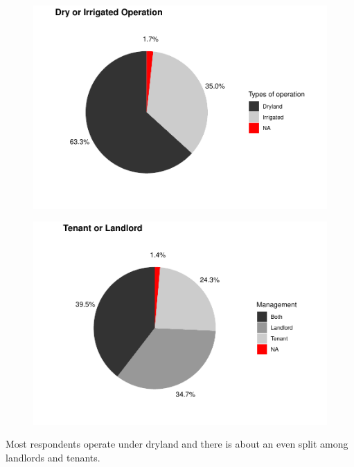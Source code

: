 \documentclass[a4paper]{article}
\begin{document}
\begin{minipage}{0.5\textwidth}
	\begin{figure}[H]
		\includegraphics[scale=0.6]{survey/pcca_survey_files/figure-latex/operation-all-1.pdf}
	\end{figure}
\end{minipage}%
\begin{minipage}{0.5\textwidth}
	\begin{figure}[H]
		\includegraphics[scale=0.6]{survey/pcca_survey_files/figure-latex/tenant-all-1.pdf}
	\end{figure}
\end{minipage}

Most respondents operate under dryland and there is about an even split among landlords and tenants. 
\end{document}
